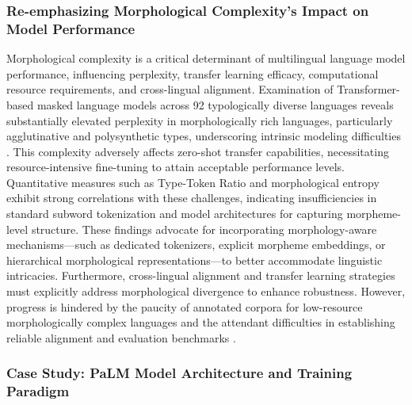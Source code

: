 \documentclass[sigconf]{acmart}
\begin{document}
\subsubsection{Re-emphasizing Morphological Complexity’s Impact on Model Performance}

Morphological complexity is a critical determinant of multilingual language model performance, influencing perplexity, transfer learning efficacy, computational resource requirements, and cross-lingual alignment. Examination of Transformer-based masked language models across 92 typologically diverse languages reveals substantially elevated perplexity in morphologically rich languages, particularly agglutinative and polysynthetic types, underscoring intrinsic modeling difficulties \cite{ref34}. This complexity adversely affects zero-shot transfer capabilities, necessitating resource-intensive fine-tuning to attain acceptable performance levels. Quantitative measures such as Type-Token Ratio and morphological entropy exhibit strong correlations with these challenges, indicating insufficiencies in standard subword tokenization and model architectures for capturing morpheme-level structure. These findings advocate for incorporating morphology-aware mechanisms---such as dedicated tokenizers, explicit morpheme embeddings, or hierarchical morphological representations---to better accommodate linguistic intricacies. Furthermore, cross-lingual alignment and transfer learning strategies must explicitly address morphological divergence to enhance robustness. However, progress is hindered by the paucity of annotated corpora for low-resource morphologically complex languages and the attendant difficulties in establishing reliable alignment and evaluation benchmarks \cite{ref34}.

\subsubsection{Case Study: PaLM Model Architecture and Training Paradigm}
\end{document}
